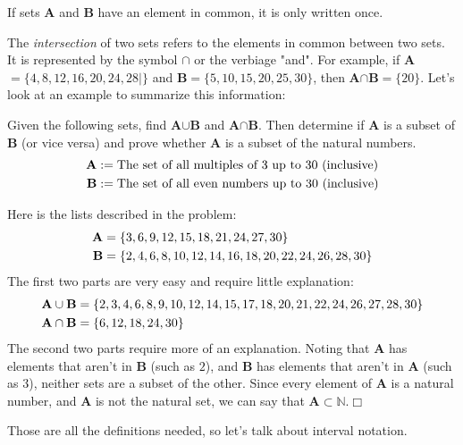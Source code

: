 \documentclass[lang=en,11pt]{elegantbook}
\begin{document}
\begin{remark}
  If sets \textbf{A} and \textbf{B} have an element in common, it is only written once.
\end{remark}

The \textit{intersection} of two sets refers to the elements in common between two sets.  It is represented by the symbol $\cap$ or the verbiage "and".  For example, if \textbf{A}$=\{4,8, 12,16,20,24,28|\}$ and \textbf{B}$=\{5,10,15,20,25,30\}$, then \textbf{A}$\cap$\textbf{B}$=\{20\}$.
Let's look at an example to summarize this information:
\begin{example}
Given the following sets, find \textbf{A}$\cup$\textbf{B} and \textbf{A}$\cap$\textbf{B}.  Then determine if \textbf{A} is a subset of \textbf{B} (or vice versa) and prove whether \textbf{A} is a subset of the natural numbers.  \begin{align*}
    \text{\textbf{A}}&:=\text{The set of all multiples of 3 up to 30 (inclusive)} \\
    \text{\textbf{B}}&:=\text{The set of all even numbers up to 30 (inclusive)}
\end{align*}
\end{example}
\begin{solution}
Here is the lists described in the problem: \begin{align*}
    \text{\textbf{A}}&=\{3,6,9,12,15,18,21,24,27,30\} \\
    \text{\textbf{B}}&=\{2,4,6,8,10,12,14,16,18,20,22,24,26,28,30\}
\end{align*}
The first two parts are very easy and require little explanation: \begin{align*}
\text{\textbf{A}}\cup\text{\textbf{B}}&=\{2,3,4,6,8,9,10,12,14,15,17,18,20,21,22,24,26,27,28,30\} \\
\text{\textbf{A}}\cap\text{\textbf{B}}&=\{6,12,18,24,30\}
\end{align*}
The second two parts require more of an explanation.  Noting that \textbf{A} has elements that aren't in \textbf{B} (such as $2$), and \textbf{B} has elements that aren't in \textbf{A} (such as $3$), neither sets are a subset of the other.  Since every element of \textbf{A} is a natural number, and \textbf{A} is not the natural set, we can say that \textbf{A}$\subset\mathbb{N}$.$\Box$
\end{solution}
\noindent Those are all the definitions needed, so let's talk about interval notation.
\end{document}
